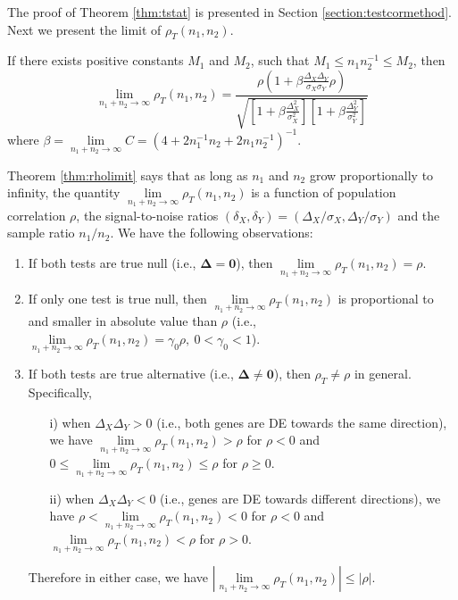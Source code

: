 The proof of Theorem \ref{thm:tstat} is presented in Section \ref{section:testcormethod}. Next 
we present the limit of $\rho_T(n_1,n_2)$.
\begin{theorem}\label{thm:rholimit}
	If there exists positive constants $M_1$ and $M_2$, such that $M_1 \leq n_1n_2^{-1}\leq 
	M_2$, then
	\begin{equation}\label{eq:limitT}
	\lim\limits_{n_1 + n_2 \rightarrow \infty} \rho_T(n_1, n_2) = \frac{\rho(1  +
		\beta\frac{\Delta_X\Delta_Y}{\sigma_X\sigma_Y}\rho)}{\sqrt{  \left[ 1 
			+\beta\frac{\Delta_X^2}{\sigma_X^2}\right]\left[ 1 + 
			\beta\frac{\Delta_Y^2}{\sigma_Y^2}\right]}}
	\end{equation}
	where %
	$\beta = \lim\limits_{n_1 + n_2 \rightarrow \infty}C = (4 + 2n_1^{-1}n_2 + 
	2n_1n_2^{-1})^{-1}$.
\end{theorem}
Theorem \ref{thm:rholimit} says that as long as $n_1$ and $n_2$ grow proportionally to 
infinity, the quantity $\lim\limits_{n_1 + n_2 \rightarrow \infty} \rho_T(n_1, n_2)$ is a function 
of population correlation $\rho$, the 
signal-to-noise ratios $(\delta_X, \delta_Y) = (\Delta_X/\sigma_X, \Delta_Y/\sigma_Y)$  and the 
sample ratio $n_1/n_2$. 
We have the following observations:
\begin{enumerate}
	\item If both tests are true null (i.e., $\bm \Delta = \bm 0$), then $\lim\limits_{n_1 + n_2 
	\rightarrow \infty} \rho_T(n_1, n_2) = \rho$.
	\item If only one test is true null, then $\lim\limits_{n_1 + n_2 \rightarrow \infty} 
	\rho_T(n_1, n_2)$ is proportional to and smaller in 
	absolute value than $\rho$ (i.e., $\lim\limits_{n_1 + n_2 \rightarrow \infty} \rho_T(n_1, n_2) 
	= \gamma_0\rho,~ 0 <\gamma_0 <1$).
	\item If both tests are true alternative (i.e., $\bm \Delta \neq \bm 0$), then $\rho_T\neq 
	\rho$ in general. Specifically,
	\begin{enumerate}
		\item[i)]  when $\Delta_X\Delta_Y >0$ (i.e., both genes are DE towards the same 
		direction), we have $\lim\limits_{n_1 + n_2 \rightarrow \infty} \rho_T(n_1, n_2)>\rho$ for 
		$\rho <0$ and $0 \leq \lim\limits_{n_1 + n_2 \rightarrow \infty} \rho_T(n_1, n_2) \leq\rho$ 
		for $\rho 
		\geq 0$.
		\item[ii)] when $\Delta_X\Delta_Y <0$ (i.e., genes are DE towards different 
		directions), we have
		$\rho <\lim\limits_{n_1 + n_2 \rightarrow \infty} \rho_T(n_1, n_2)<0$ for $\rho <0$ and 
		$\lim\limits_{n_1 + n_2 \rightarrow \infty} \rho_T(n_1, n_2)<\rho$ for $\rho>0$.
	\end{enumerate}
	Therefore in either case, we have $|\lim\limits_{n_1 + n_2 \rightarrow \infty} \rho_T(n_1, 
	n_2)| \leq |\rho|$. 
\end{enumerate}



